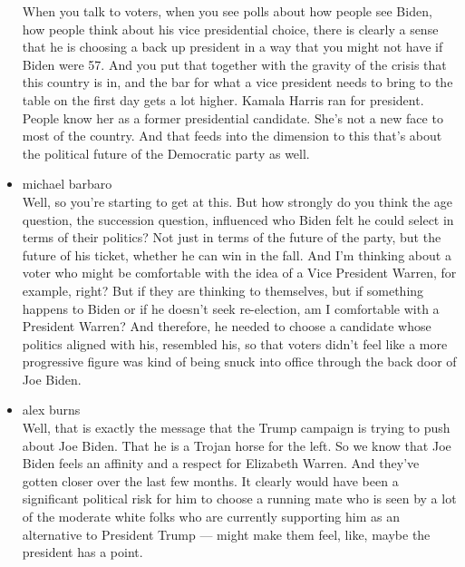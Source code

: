 \begin{itemize}
  When you talk to voters, when you see polls about how people see
  Biden, how people think about his vice presidential choice, there is
  clearly a sense that he is choosing a back up president in a way that
  you might not have if Biden were 57. And you put that together with
  the gravity of the crisis that this country is in, and the bar for
  what a vice president needs to bring to the table on the first day
  gets a lot higher. Kamala Harris ran for president. People know her as
  a former presidential candidate. She's not a new face to most of the
  country. And that feeds into the dimension to this that's about the
  political future of the Democratic party as well.
\item
  michael barbaro\\
  Well, so you're starting to get at this. But how strongly do you think
  the age question, the succession question, influenced who Biden felt
  he could select in terms of their politics? Not just in terms of the
  future of the party, but the future of his ticket, whether he can win
  in the fall. And I'm thinking about a voter who might be comfortable
  with the idea of a Vice President Warren, for example, right? But if
  they are thinking to themselves, but if something happens to Biden or
  if he doesn't seek re-election, am I comfortable with a President
  Warren? And therefore, he needed to choose a candidate whose politics
  aligned with his, resembled his, so that voters didn't feel like a
  more progressive figure was kind of being snuck into office through
  the back door of Joe Biden.
\item
  alex burns\\
  Well, that is exactly the message that the Trump campaign is trying to
  push about Joe Biden. That he is a Trojan horse for the left. So we
  know that Joe Biden feels an affinity and a respect for Elizabeth
  Warren. And they've gotten closer over the last few months. It clearly
  would have been a significant political risk for him to choose a
  running mate who is seen by a lot of the moderate white folks who are
  currently supporting him as an alternative to President Trump ---
  might make them feel, like, maybe the president has a point.


\end{itemize}
